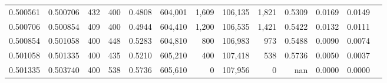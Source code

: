 \begin{tabular}{rrrrrrrrrrrrr}
0.500561 & 0.500706 &    432 & 400 &                                     0.4808 & 604,001 &   1,609 & 106,135 &   1,821 & 0.5309 & 0.0169 & 0.0149 \\
0.500706 & 0.500854 &    409 & 400 &                                     0.4944 & 604,410 &   1,200 & 106,535 &   1,421 & 0.5422 & 0.0132 & 0.0111 \\
0.500854 & 0.501058 &    400 & 448 &                                     0.5283 & 604,810 &     800 & 106,983 &     973 & 0.5488 & 0.0090 & 0.0074 \\
0.501058 & 0.501335 &    400 & 435 &                                     0.5210 & 605,210 &     400 & 107,418 &     538 & 0.5736 & 0.0050 & 0.0037 \\
0.501335 & 0.503740 &    400 & 538 &                                     0.5736 & 605,610 &       0 & 107,956 &       0 &    nan & 0.0000 & 0.0000 \\
\bottomrule
\end{tabular}
